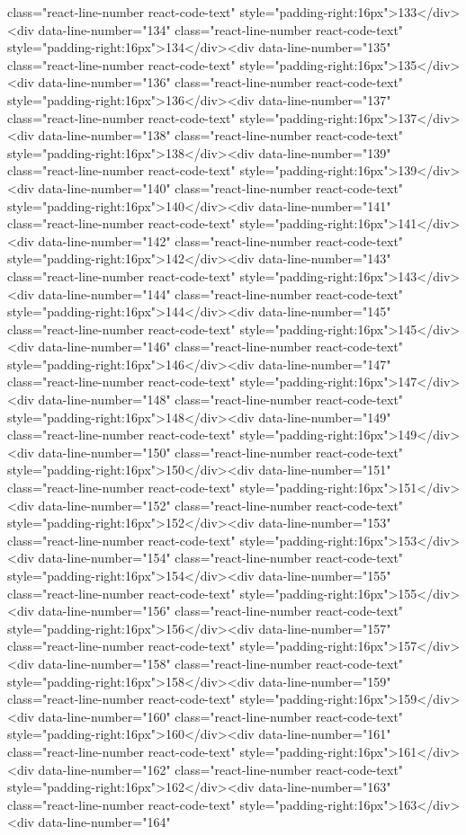 {{{{{{{{{{{{{{{{{{{{{{{{{{{{{{{class="react-line-number react-code-text" style="padding-right:16px">133</div><div data-line-number="134" class="react-line-number react-code-text" style="padding-right:16px">134</div><div data-line-number="135" class="react-line-number react-code-text" style="padding-right:16px">135</div><div data-line-number="136" class="react-line-number react-code-text" style="padding-right:16px">136</div><div data-line-number="137" class="react-line-number react-code-text" style="padding-right:16px">137</div><div data-line-number="138" class="react-line-number react-code-text" style="padding-right:16px">138</div><div data-line-number="139" class="react-line-number react-code-text" style="padding-right:16px">139</div><div data-line-number="140" class="react-line-number react-code-text" style="padding-right:16px">140</div><div data-line-number="141" class="react-line-number react-code-text" style="padding-right:16px">141</div><div data-line-number="142" class="react-line-number react-code-text" style="padding-right:16px">142</div><div data-line-number="143" class="react-line-number react-code-text" style="padding-right:16px">143</div><div data-line-number="144" class="react-line-number react-code-text" style="padding-right:16px">144</div><div data-line-number="145" class="react-line-number react-code-text" style="padding-right:16px">145</div><div data-line-number="146" class="react-line-number react-code-text" style="padding-right:16px">146</div><div data-line-number="147" class="react-line-number react-code-text" style="padding-right:16px">147</div><div data-line-number="148" class="react-line-number react-code-text" style="padding-right:16px">148</div><div data-line-number="149" class="react-line-number react-code-text" style="padding-right:16px">149</div><div data-line-number="150" class="react-line-number react-code-text" style="padding-right:16px">150</div><div data-line-number="151" class="react-line-number react-code-text" style="padding-right:16px">151</div><div data-line-number="152" class="react-line-number react-code-text" style="padding-right:16px">152</div><div data-line-number="153" class="react-line-number react-code-text" style="padding-right:16px">153</div><div data-line-number="154" class="react-line-number react-code-text" style="padding-right:16px">154</div><div data-line-number="155" class="react-line-number react-code-text" style="padding-right:16px">155</div><div data-line-number="156" class="react-line-number react-code-text" style="padding-right:16px">156</div><div data-line-number="157" class="react-line-number react-code-text" style="padding-right:16px">157</div><div data-line-number="158" class="react-line-number react-code-text" style="padding-right:16px">158</div><div data-line-number="159" class="react-line-number react-code-text" style="padding-right:16px">159</div><div data-line-number="160" class="react-line-number react-code-text" style="padding-right:16px">160</div><div data-line-number="161" class="react-line-number react-code-text" style="padding-right:16px">161</div><div data-line-number="162" class="react-line-number react-code-text" style="padding-right:16px">162</div><div data-line-number="163" class="react-line-number react-code-text" style="padding-right:16px">163</div><div data-line-number="164" }}}}}}}}}}}}}}}}}}}}}}}}}}}}}}}
